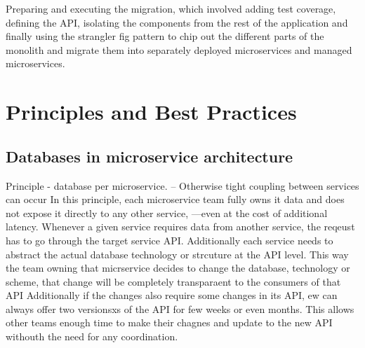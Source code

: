 \documentclass[a4paper, 11pt]{book}
\begin{document}
{    Preparing and executing the migration,
    which involved adding test coverage,
    defining the API,
    isolating the components from the rest of the application and finally using the strangler fig pattern to chip out the different parts of
    the monolith and migrate them into separately deployed microservices and managed microservices.


    \section{Principles and Best Practices}

    \subsection{Databases in microservice architecture}
    Principle - database per microservice.
    -- Otherwise tight coupling between services can occur
    In this principle, each microservice team fully owns it data and does not expose it directly to any other service, ---even at the cost of additional latency.
    Whenever a given service requires data from another service, the reqeust has to go through the target service API.
    Additionally each service needs to abstract the actual database technology or strcuture at the API level.
    This way the team owning that micrservice decides to change the database, technology or scheme, that change will be completely transparaent to the consumers of that API
    Additionally if the changes also require some changes in its API, ew can always offer two versionsxs of the API for few weeks or even months.
    This allows other teams enough time to make their chagnes and update to the new API withouth the need for any coordination.

}
\end{document}
